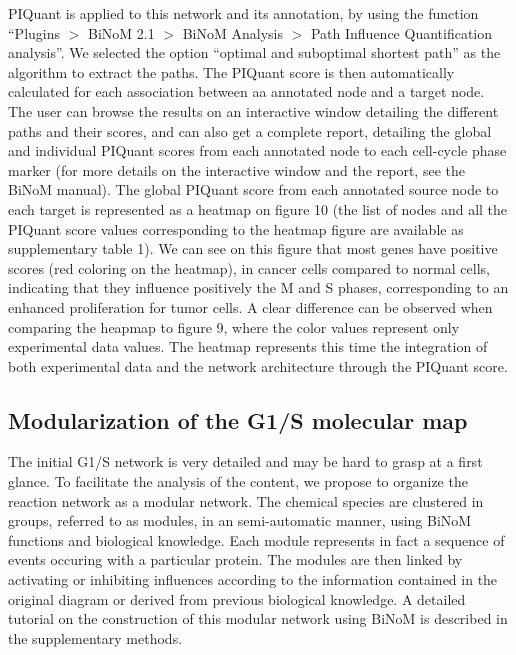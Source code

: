\documentclass[10pt]{bmc_article}
\newenvironment{bmcformat}{\baselineskip20pt\sloppy\setboolean{publ}{false}}{\baselineskip20pt\sloppy}
\begin{document}
\begin{bmcformat}
PIQuant is applied to this network and its annotation, by using the function
``Plugins $>$ BiNoM 2.1 $>$ BiNoM Analysis $>$ Path Influence Quantification
analysis''. We selected the option ``optimal and
suboptimal shortest path'' as the algorithm to extract the paths. The PIQuant
score is then automatically calculated for each association
between aa annotated node and a target node. The user can browse the results on an
interactive window detailing the different paths and their scores, and can also
get a complete report, detailing the global and individual PIQuant scores from
each annotated node to each cell-cycle phase marker (for more details on
the interactive window and the report, see the BiNoM manual).
The global PIQuant score from each annotated source node to each target is
represented as a heatmap on figure 10 (the list of nodes and all the PIQuant
score values corresponding to the heatmap figure are available as supplementary
table 1). We can see on this figure that most
genes have positive scores (red coloring on the heatmap), in cancer cells compared to normal cells, indicating that they influence positively the M and
S phases, corresponding to an enhanced proliferation for tumor cells.
A clear difference can be observed when comparing the heapmap to figure 9, where
the color values represent only experimental data values. The heatmap represents
this time the integration of both experimental data and the network
architecture through the PIQuant score.



\subsection*{Modularization of the G1/S molecular map}

The initial G1/S network is very detailed and may be hard to grasp at a first glance.
To facilitate the analysis of the content, we propose to organize the reaction
network as a modular network. The chemical species are clustered in groups, referred to
as modules, in an semi-automatic manner, using BiNoM functions and biological
knowledge. Each module represents in fact a
sequence of events occuring with a particular protein. The modules are then
linked by activating or inhibiting influences according to the information
contained in the original diagram or derived from previous biological knowledge.
A detailed tutorial on the construction of this modular network using BiNoM is
described in the supplementary methods.


\end{bmcformat}
\end{document}
